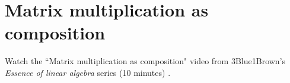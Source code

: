 \section{Matrix multiplication as composition}

Watch the ``Matrix multiplication as composition" video from 3Blue1Brown's
\textit{Essence of linear algebra} series (10 minutes)
\cite{bib:linalg_matrix_multiplication_as_composition}.
